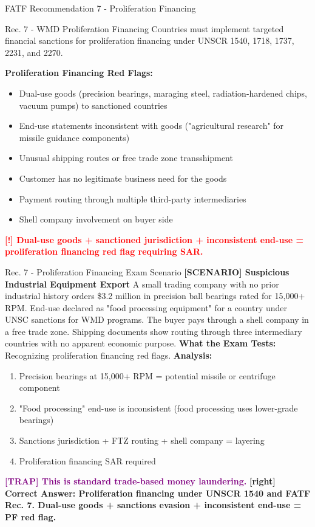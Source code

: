 \documentclass[11pt,a4paper]{beamer}
\newcommand{\redflag}[1]{\textcolor{red}{\textbf{[!] #1}}}
\newcommand{\trap}[1]{\textcolor{purple}{\textbf{[TRAP] #1}}}
\newcommand{\correct}[1]{\textcolor{green!50!black}{\textbf{[right] #1}}}
\newcommand{\scenario}[1]{\textcolor{blue!70!black}{\textbf{[SCENARIO] #1}}}
\begin{document}

\begin{frame}{FATF Recommendation 7 - Proliferation Financing}
\begin{block}{Rec. 7 - WMD Proliferation Financing}
Countries must implement targeted financial sanctions for proliferation financing under UNSCR 1540, 1718, 1737, 2231, and 2270.
\end{block}
\textbf{Proliferation Financing Red Flags:}
\begin{itemize}
\item Dual-use goods (precision bearings, maraging steel, radiation-hardened chips, vacuum pumps) to sanctioned countries
\item End-use statements inconsistent with goods ("agricultural research" for missile guidance components)
\item Unusual shipping routes or free trade zone transshipment
\item Customer has no legitimate business need for the goods
\item Payment routing through multiple third-party intermediaries
\item Shell company involvement on buyer side
\end{itemize}
\redflag{Dual-use goods + sanctioned jurisdiction + inconsistent end-use = proliferation financing red flag requiring SAR.}
\end{frame}

\begin{frame}{Rec. 7 - Proliferation Financing Exam Scenario}
\scenario{Suspicious Industrial Equipment Export}
A small trading company with no prior industrial history orders \$3.2 million in precision ball bearings rated for 15,000+ RPM. End-use declared as "food processing equipment" for a country under UNSC sanctions for WMD programs. The buyer pays through a shell company in a free trade zone. Shipping documents show routing through three intermediary countries with no apparent economic purpose.
\vspace{0.2cm}
\textbf{What the Exam Tests:} Recognizing proliferation financing red flags.
\vspace{0.2cm}
\textbf{Analysis:}
\begin{enumerate}
\item Precision bearings at 15,000+ RPM = potential missile or centrifuge component
\item "Food processing" end-use is inconsistent (food processing uses lower-grade bearings)
\item Sanctions jurisdiction + FTZ routing + shell company = layering
\item Proliferation financing SAR required
\end{enumerate}
\trap{This is standard trade-based money laundering.}
\correct{Correct Answer: Proliferation financing under UNSCR 1540 and FATF Rec. 7. Dual-use goods + sanctions evasion + inconsistent end-use = PF red flag.}
\end{frame}
\end{document}
